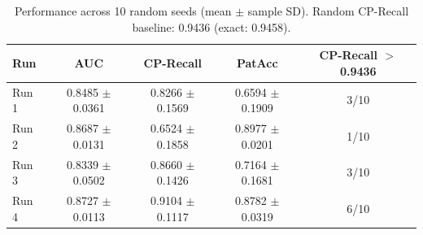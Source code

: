 \begin{table}[t]
\centering
\caption{Performance across 10 random seeds (mean $\pm$ sample SD). Random CP-Recall baseline: 0.9436 (exact: 0.9458).}
\label{tab:multiseed}
\begin{tabular}{lcccc}
\hline
Run & AUC & CP-Recall & PatAcc & CP-Recall $>$ 0.9436 \\ \hline
Run 1 & 0.8485 $\pm$ 0.0361 & 0.8266 $\pm$ 0.1569 & 0.6594 $\pm$ 0.1909 & 3/10 \\
Run 2 & 0.8687 $\pm$ 0.0131 & 0.6524 $\pm$ 0.1858 & 0.8977 $\pm$ 0.0201 & 1/10 \\
Run 3 & 0.8339 $\pm$ 0.0502 & 0.8660 $\pm$ 0.1426 & 0.7164 $\pm$ 0.1681 & 3/10 \\
Run 4 & 0.8727 $\pm$ 0.0113 & 0.9104 $\pm$ 0.1117 & 0.8782 $\pm$ 0.0319 & 6/10 \\
\hline
\end{tabular}
\end{table}
